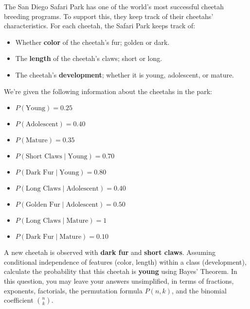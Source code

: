 \documentclass[twoside,12pt]{article}
\begin{document}
\begin{probset}
\newpage \begin{prob}[(6 pts)]

The San Diego Safari Park has one of the world's most successful cheetah breeding programs. To support this, they keep track of their cheetahs' characteristics. For each cheetah, the Safari Park keeps track of:

\begin{itemize}
    \item Whether \textbf{color} of the cheetah's fur; golden or dark.
    \item The \textbf{length} of the cheetah's claws; short or long.
    \item The cheetah's \textbf{development}; whether it is young, adolescent, or mature.
\end{itemize}

We're given the following information about the cheetahs in the park:

\begin{itemize}
    \item $P(\text{Young}) = 0.25$
    \item $P(\text{Adolescent}) = 0.40$
    \item $P(\text{Mature}) = 0.35$
    \item $P(\text{Short Claws} \mid \text{Young}) = 0.70$
    \item $P(\text{Dark Fur} \mid \text{Young}) = 0.80$
    \item $P(\text{Long Claws} \mid \text{Adolescent}) = 0.40$
    \item $P(\text{Golden Fur} \mid \text{Adolescent}) = 0.50$
    \item $P(\text{Long Claws} \mid \text{Mature}) = 1$
    \item $P(\text{Dark Fur} \mid \text{Mature}) = 0.10$
\end{itemize}


A new cheetah is observed with \textbf{dark fur} and \textbf{short claws}. Assuming conditional independence of features (color, length) within a class (development), calculate the probability that this cheetah is \textbf{young} using Bayes' Theorem. In this question, you may leave your answers unsimplified, in terms of fractions, exponents, factorials, the permutation formula $P(n, k)$, and the binomial coefficient ${n \choose k}$.


\begin{responsebox}{2.8in}
    
\end{responsebox}



\end{prob}
\end{probset}
\end{document}
